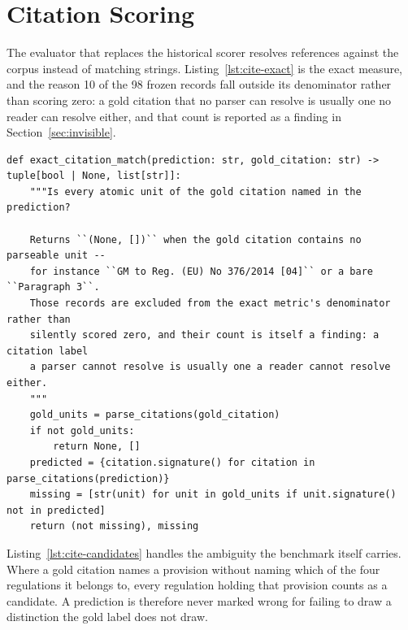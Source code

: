 \section{Citation Scoring}

The evaluator that replaces the historical scorer resolves references against
the corpus instead of matching strings. Listing~\ref{lst:cite-exact} is the
exact measure, and the reason 10 of the 98 frozen records fall outside its
denominator rather than scoring zero: a gold citation that no parser can
resolve is usually one no reader can resolve either, and that count is reported
as a finding in Section~\ref{sec:invisible}.

\begin{lstlisting}[style=thesis,caption={Exact citation matching, with unresolvable gold labels excluded rather than failed. Source: \texttt{src/aviation\_rag/evaluation/citations.py}, lines 314--328.},label={lst:cite-exact}]
def exact_citation_match(prediction: str, gold_citation: str) -> tuple[bool | None, list[str]]:
    """Is every atomic unit of the gold citation named in the prediction?

    Returns ``(None, [])`` when the gold citation contains no parseable unit --
    for instance ``GM to Reg. (EU) No 376/2014 [04]`` or a bare ``Paragraph 3``.
    Those records are excluded from the exact metric's denominator rather than
    silently scored zero, and their count is itself a finding: a citation label
    a parser cannot resolve is usually one a reader cannot resolve either.
    """
    gold_units = parse_citations(gold_citation)
    if not gold_units:
        return None, []
    predicted = {citation.signature() for citation in parse_citations(prediction)}
    missing = [str(unit) for unit in gold_units if unit.signature() not in predicted]
    return (not missing), missing
\end{lstlisting}

Listing~\ref{lst:cite-candidates} handles the ambiguity the benchmark itself
carries. Where a gold citation names a provision without naming which of the
four regulations it belongs to, every regulation holding that provision counts
as a candidate. A prediction is therefore never marked wrong for failing to
draw a distinction the gold label does not draw.

